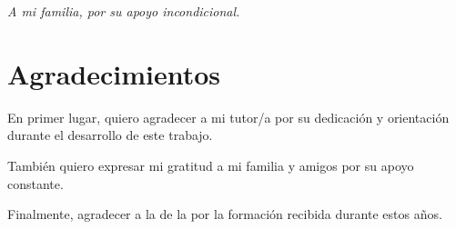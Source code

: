 
\thispagestyle{empty}
\vspace*{\fill}
\begin{flushright}
  \textit{A mi familia, por su apoyo incondicional.}
\end{flushright}
\vspace*{\fill}
\cleardoublepage

\chapter*{Agradecimientos}

En primer lugar, quiero agradecer a mi tutor/a por su dedicación y orientación durante el desarrollo de este trabajo.

También quiero expresar mi gratitud a mi familia y amigos por su apoyo constante.

Finalmente, agradecer a la \EPSfacultad{} de la \EPSuniversidad{} por la formación recibida durante estos años.

\cleardoublepage

